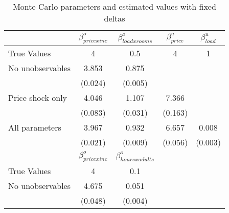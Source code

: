 \begin{table}[!ht]
	\centering
		\caption{Monte Carlo parameters and estimated values with fixed deltas}
\begin{tabular}{lcccc}
		\toprule
               &     $\beta^o_{price x inc}$ & $\beta^o_{load x rooms}$ & $\beta^u_{price}$ & $\beta^u_{load}$ \\
		\midrule
		True Values&   4&  0.5 & 4 & 1 \\
		No unobservables &     3.853& 0.875 & & \\
		& (0.024) & (0.005) & & \\
		Price shock only & 4.046 & 1.107 & 7.366 \\
		& (0.083) & (0.031) & (0.163) \\
		All parameters&     3.967 & 0.932 & 6.657 & 0.008 \\
		& (0.021) & (0.009)& (0.056) & (0.003) \\
		\midrule 
		&     $\beta^o_{price x inc}$ & $\beta^o_{hours x adults}$ &  &  \\
		\midrule
		True Values & 4 & 0.1 & &  \\
		No unobservables & 4.675 & 0.051 & & \\
		 & (0.048) & (0.004) & & \\
		\bottomrule
	\end{tabular}
\end{table}